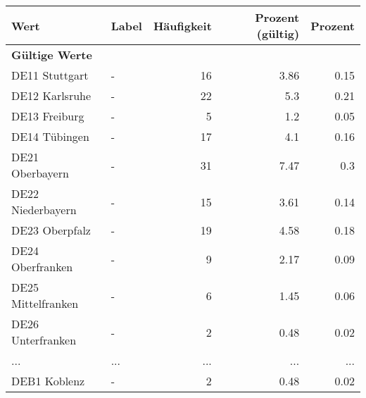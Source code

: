      \begin{longtable}{Xlrrr}
     \toprule
     \textbf{Wert} & \textbf{Label} & \textbf{Häufigkeit} & \textbf{Prozent (gültig)} & \textbf{Prozent} \\
     \endhead
     \midrule
     \multicolumn{5}{l}{\textbf{Gültige Werte}}\\
        \multicolumn{1}{X}{DE11 Stuttgart} & - & \num{16} & \num[round-mode=places,round-precision=2]{3.86} & \num[round-mode=places,round-precision=2]{0.15} \\
        \multicolumn{1}{X}{DE12 Karlsruhe} & - & \num{22} & \num[round-mode=places,round-precision=2]{5.3} & \num[round-mode=places,round-precision=2]{0.21} \\
        \multicolumn{1}{X}{DE13 Freiburg} & - & \num{5} & \num[round-mode=places,round-precision=2]{1.2} & \num[round-mode=places,round-precision=2]{0.05} \\
        \multicolumn{1}{X}{DE14 Tübingen} & - & \num{17} & \num[round-mode=places,round-precision=2]{4.1} & \num[round-mode=places,round-precision=2]{0.16} \\
        \multicolumn{1}{X}{DE21 Oberbayern} & - & \num{31} & \num[round-mode=places,round-precision=2]{7.47} & \num[round-mode=places,round-precision=2]{0.3} \\
        \multicolumn{1}{X}{DE22 Niederbayern} & - & \num{15} & \num[round-mode=places,round-precision=2]{3.61} & \num[round-mode=places,round-precision=2]{0.14} \\
        \multicolumn{1}{X}{DE23 Oberpfalz} & - & \num{19} & \num[round-mode=places,round-precision=2]{4.58} & \num[round-mode=places,round-precision=2]{0.18} \\
        \multicolumn{1}{X}{DE24 Oberfranken} & - & \num{9} & \num[round-mode=places,round-precision=2]{2.17} & \num[round-mode=places,round-precision=2]{0.09} \\
        \multicolumn{1}{X}{DE25 Mittelfranken} & - & \num{6} & \num[round-mode=places,round-precision=2]{1.45} & \num[round-mode=places,round-precision=2]{0.06} \\
        \multicolumn{1}{X}{DE26 Unterfranken} & - & \num{2} & \num[round-mode=places,round-precision=2]{0.48} & \num[round-mode=places,round-precision=2]{0.02} \\
       ... & ... & ... & ... & ... \\
        \multicolumn{1}{X}{DEB1 Koblenz} & - & \num{2} & \num[round-mode=places,round-precision=2]{0.48} & \num[round-mode=places,round-precision=2]{0.02} \\

\end{longtable}

